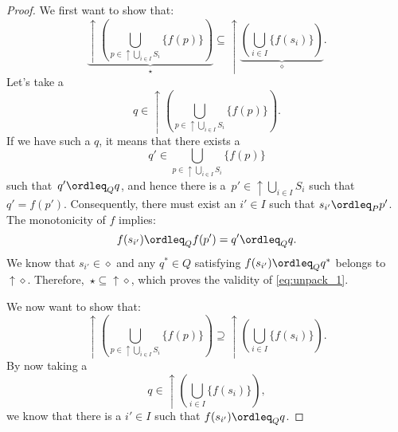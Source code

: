 \begin{proof}
We first want to show that:
\begin{equation}
\label{eq:unpack_1}
    \underbrace{\uparrow \left(\bigcup_{p\in \uparrow \bigcup_{i\in I}S_i}\{f(p)\} \right)}_{\star}\subseteq \uparrow \underbrace{\left( \bigcup_{i\in I}\{f(s_i)\}\right)}_{\diamond}.
\end{equation}
Let's take a
\begin{equation}
    q\in \uparrow\left( \bigcup_{p\in \uparrow \bigcup_{i\in I}S_i}\{f(p)\}\right).
\end{equation}
If we have such a $q$, it means that there exists a
\begin{equation}
    q'\in \bigcup_{p\in \uparrow\bigcup_{i\in I}S_i}\{f(p)\}
\end{equation}
such that~$q'\ordleq_Q q$, and hence there is a~$p'\in \uparrow \bigcup_{i\in I} S_i$ such that $q'=f(p')$. Consequently, there must exist an $i'\in I$ such that $s_{i'}\ordleq_P p'$. The monotonicity of $f$ implies:
\begin{equation}
    f(s_{i'})\ordleq_Q f(p')=q'\ordleq_Q q.
\end{equation}
We know that $s_{i'}\in \diamond$ and any $q^*\in Q$ satisfying $f(s_{i'})\ordleq_Q q^*$ belongs to $\uparrow \diamond$. Therefore,~$\star\subseteq \uparrow \diamond$, which proves the validity of \cref{eq:unpack_1}.

We now want to show that:
\begin{equation}
\label{eq:unpack_2}
    \uparrow \left(\bigcup_{p\in \uparrow \bigcup_{i\in I}S_i}\{f(p)\} \right)\supseteq \uparrow \left( \bigcup_{i\in I}\{f(s_i)\}\right).
\end{equation}
By now taking a
\begin{equation}
    q\in \uparrow \left( \bigcup_{i\in I}\{f(s_i)\}\right),
\end{equation}
we know that there is a $i'\in I$ such that $f(s_{i'})\ordleq_Q q$. 
\end{proof}

